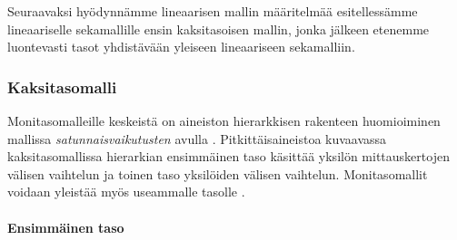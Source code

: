 \documentclass[finnish]{docopts}
\begin{document}


Seuraavaksi hyödynnämme lineaarisen mallin määritelmää esitellessämme lineaariselle sekamallille ensin kaksitasoisen mallin, jonka jälkeen etenemme luontevasti tasot yhdistävään \cite{laird82} yleiseen lineaariseen sekamalliin.

\subsubsection{Kaksitasomalli}
\label{ssb:kaksitaso}

Monitasomalleille keskeistä on aineiston hierarkkisen rakenteen huomioiminen mallissa \textit{satunnaisvaikutusten} avulla \cite{talbott06}. Pitkittäisaineistoa kuvaavassa kaksitasomallissa hierarkian ensimmäinen taso käsittää yksilön mittauskertojen välisen vaihtelun ja toinen taso yksilöiden välisen vaihtelun. Monitasomallit voidaan yleistää myös useammalle tasolle \cite{goldstein11, burzykowski13}.

\paragraph{Ensimmäinen taso}\mbox{}\\
\end{document}
